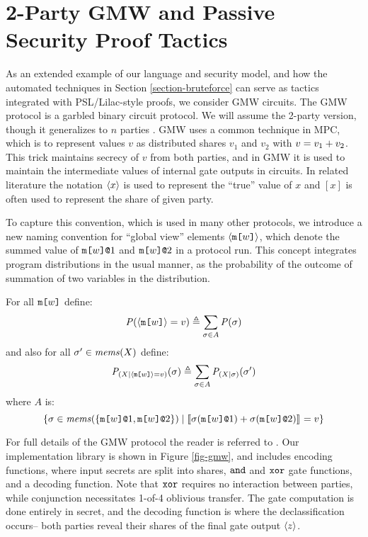 \section{2-Party GMW and Passive Security Proof Tactics}
\label{section-metalang-gmw}
\label{section-example-gmw}



As an extended example of our language and security model, and how the
automated techniques in Section \ref{section-bruteforce} can serve
as tactics integrated with PSL/Lilac-style proofs, we consider GMW
circuits.  The GMW protocol is a garbled binary circuit protocol.  We
will assume the 2-party version, though it generalizes to $n$
parties \cite{goldreich2019play}. GMW uses a common technique in MPC, which is to
represent values $v$ as distributed shares $v_1$ and $v_2$ with $v =
v_1 + v_2$. This trick maintains secrecy of $v$ from both
parties, and in GMW it is used to maintain the intermediate values of
internal gate outputs in circuits. In related literature the notation
$\langle x \rangle$ is used to represent the ``true'' value of $x$ and $[x]$
is often used to represent the share of given party.

To capture this convention, which is used in many other protocols, we
introduce a new naming convention for ``global view'' elements
$\langle \texttt{m[}w\texttt{]} \rangle$, which denote the summed value of
$\texttt{m[}w\texttt{]}\texttt{@}1$ and $\texttt{m[}w\texttt{]}\texttt{@}2$ in a protocol
run. This concept integrates program distributions in the
usual manner, as the probability of the outcome of summation
of two variables in the distribution.
\begin{definition}
  For all $\texttt{m[}w\texttt{]}$ define:
  $$\mathit{P}(\langle \texttt{m[}w\texttt{]} \rangle = v) \triangleq \sum_{\sigma \in A} \mathit{P}(\sigma)$$
  and also for all $\sigma' \in \mathit{mems}(X)$ define:
  $$\mathit{P}_{({X}|{\langle \texttt{m[}w\texttt{]} \rangle = v})}(\sigma) \triangleq  \sum_{\sigma \in A} \mathit{P}_{({X}|{\sigma})}(\sigma')$$
  where $A$ is:
  $$\{ \sigma \in \mathit{mems}(\{ \texttt{m[}w\texttt{]}\texttt{@}1,\texttt{m[}w\texttt{]}\texttt{@}2 \} ) \mid
      \llbracket \sigma(\texttt{m[}w\texttt{]}\texttt{@}1) + \sigma(\texttt{m[}w\texttt{]}\texttt{@}2) \rrbracket_{} = v \}$$
\end{definition}

For full details of the GMW protocol the reader is referred to
\cite{evans2018pragmatic}. Our implementation library is shown in
Figure \ref{fig-gmw}, and includes encoding functions, where
input secrets are split into shares, $\texttt{and}$ and $\texttt{xor}$ gate
functions, and a decoding function. Note that $\texttt{xor}$ requires
no interaction between parties, while conjunction necessitates
1-of-4 oblivious transfer. The gate computation is
done entirely in secret, and the decoding function
is where the declassification occurs-- both parties reveal
their shares of the final gate output $\langle z \rangle$.


